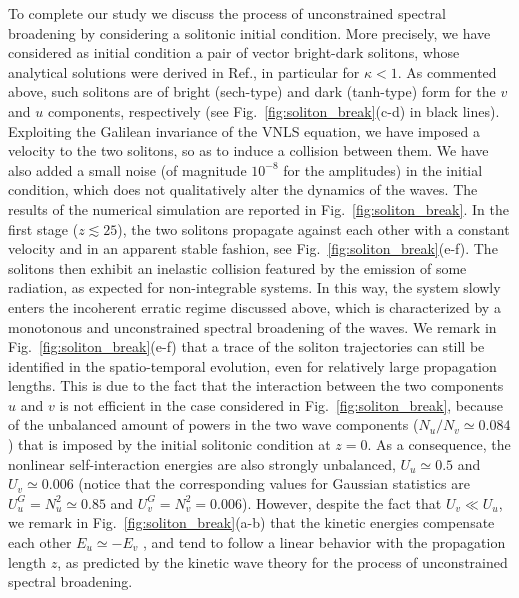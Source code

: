\documentclass[pra,twocolumn,showpacs,preprintnumbers,amsmath,amssymb]{revtex4}
\begin{document}
To complete our study we discuss the process of unconstrained spectral broadening by considering a   solitonic initial condition.
More precisely, we have considered as initial condition a pair of vector bright-dark solitons, whose analytical solutions were derived in Ref.\cite{Kivshar_PLA}, in particular for $\kappa < 1$.
As commented above, such solitons are of bright (sech-type) and dark (tanh-type) form for the $v$ and $u$ components, respectively (see Fig.~\ref{fig:soliton_break}(c-d) in black lines).
Exploiting the Galilean  invariance of the VNLS equation, we have imposed a velocity to the two solitons, so as to induce a collision between them.
We have also added a small noise (of magnitude $10^{-8}$ for the amplitudes) in the initial condition, which does not qualitatively alter the  dynamics of the waves.
The results of the numerical simulation are reported in Fig.~\ref{fig:soliton_break}.
In the first stage ($z \lesssim 25$), the two solitons propagate against each other with a constant velocity and in an apparent stable fashion, see Fig.~\ref{fig:soliton_break}(e-f).  
The solitons then exhibit an inelastic collision featured by the emission of some radiation, as expected for non-integrable systems. 
In this way, the system slowly enters the incoherent erratic regime discussed  above, which is characterized by a monotonous and unconstrained spectral broadening of the waves.
We remark in Fig.~\ref{fig:soliton_break}(e-f) that a trace of the soliton trajectories can still be identified in the spatio-temporal evolution, even for relatively large propagation lengths.
This is due to the fact that the interaction between the two components $u$ and $v$ is not efficient in the case considered in Fig.~\ref{fig:soliton_break}, because of the unbalanced amount of powers in the two wave components ($N_u / N_v \simeq 0.084$) that is imposed by the initial solitonic condition at $z=0$.
As a consequence, the nonlinear self-interaction energies are also strongly unbalanced, $U_u \simeq 0.5$ and $U_v \simeq 0.006$ (notice that the corresponding values for Gaussian statistics are $U_u^G = N_u^2 \simeq 0.85$ and $U_v^G = N_v^2=0.006$).
However, despite the fact that $U_v \ll U_u$, we remark in Fig.~\ref{fig:soliton_break}(a-b) that the kinetic energies compensate each other $E_u \simeq -E_v$ , and tend to follow a linear behavior with the propagation length $z$, as predicted by the kinetic wave theory for the process of unconstrained spectral broadening.
\end{document}
